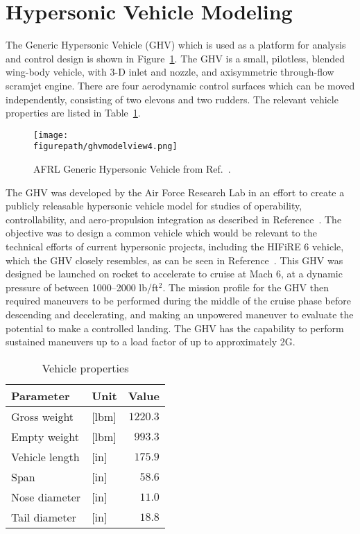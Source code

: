 \section{Hypersonic Vehicle Modeling}

The Generic Hypersonic Vehicle (GHV) which is used as a platform for analysis and control design is shown in Figure~\ref{fig.ghvclouds}.
The GHV is a small, pilotless, blended wing-body vehicle, with 3-D inlet and nozzle, and axisymmetric through-flow scramjet engine.
There are four aerodynamic control surfaces which can be moved independently, consisting of two elevons and two rudders.
The relevant vehicle properties are listed in Table~\ref{tab:vehicle_properties}.

\begin{figure}[h]
  \begin{center}
    \texttt{[image: \\figurepath/ghvmodelview4.png]}
    \caption{AFRL Generic Hypersonic Vehicle from Ref.\ \cite{ruttle.ghv.2012}.\label{fig.ghvclouds}}
  \end{center}
\end{figure}

The GHV was developed by the Air Force Research Lab in an effort to create a publicly releasable hypersonic vehicle model for studies of operability, controllability, and aero-propulsion integration as described in Reference\ \cite{ruttle.ghv.2012}.
The objective was to design a common vehicle which would be relevant to the technical efforts of current hypersonic projects, including the HIFiRE 6 vehicle, which the GHV closely resembles, as can be seen in Reference\ \cite{bolender.hifire6.2012}.
This GHV was designed be launched on rocket to accelerate to cruise at Mach 6, at a dynamic pressure of between 1000--2000 lb/ft$^{2}$.
The mission profile for the GHV then required maneuvers to be performed during the middle of the cruise phase before descending and decelerating, and making an unpowered maneuver to evaluate the potential to make a controlled landing.
The GHV has the capability to perform sustained maneuvers up to a load factor of up to approximately 2G.

\begin{table}[H]
  \centering
  \caption{Vehicle properties}
  \begin{tabular}{llr}
    \toprule
    Parameter & Unit & Value \\ \midrule
    Gross weight & [lbm] & $1220.3$ \\
    Empty weight & [lbm] & $993.3$ \\
    Vehicle length & [in] & $175.9$ \\
    Span & [in] & $58.6$ \\
    Nose diameter & [in] & $11.0$ \\
    Tail diameter & [in] & $18.8$ \\
    \bottomrule
  \end{tabular}\label{tab:vehicle_properties}
\end{table}

